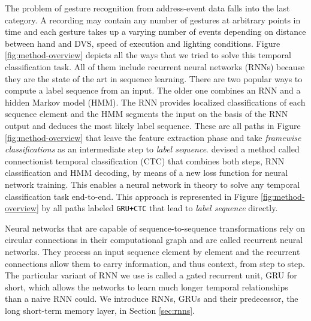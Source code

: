 The problem of gesture recognition from address-event data falls into the last
category. A recording may contain any number of gestures at arbitrary points in
time and each gesture takes up a varying number of events depending on distance
between hand and DVS, speed of execution and lighting conditions. Figure
\ref{fig:method-overview} depicts all the ways that we tried to solve this
temporal classification task. All of them include recurrent neural networks
(RNNs) because they are the state of the art in sequence learning. There are two
popular ways to compute a label sequence from an input. The older one combines
an RNN and a hidden Markov model (HMM). The RNN provides localized
classifications of each sequence element and the HMM segments the input on the
basis of the RNN output and deduces the most likely label sequence. These are
all paths in Figure \ref{fig:method-overview} that leave the feature extraction
phase and take \emph{framewise classifications} as an intermediate step to
\emph{label sequence}. \citeauthor{ctc} devised a method called connectionist
temporal classification (CTC) that combines both steps, RNN classification and
HMM decoding, by means of a new loss function for neural network training. This
enables a neural network in theory to solve any temporal classification task
end-to-end. This approach is represented in Figure \ref{fig:method-overview} by
all paths labeled \texttt{GRU+CTC} that lead to \emph{label sequence} directly.

Neural networks that are capable of sequence-to-sequence transformations rely on
circular connections in their computational graph and are called recurrent
neural networks. They process an input sequence element by element and the
recurrent connections allow them to carry information, and thus context, from
step to step. The particular variant of RNN we use is called a gated recurrent
unit, GRU for short, which allows the networks to learn much longer temporal
relationships than a naive RNN could. We introduce RNNs, GRUs and their
predecessor, the long short-term memory layer, in Section \ref{sec:rnns}.

